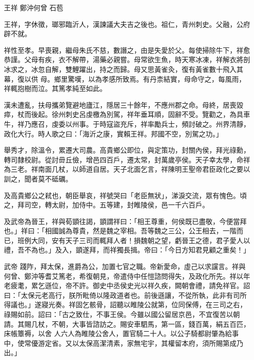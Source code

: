 
\begin{pinyinscope}
王祥
 鄭沖何曾
 石苞



 王祥，字休徵，瑯邪臨沂人，漢諫議大夫吉之後也。祖仁，青州刺史。父融，公府辟不就。



 祥性至孝。早喪親，繼母朱氏不慈，數譖之，由是失愛於父。每使掃除牛下，祥愈恭謹。父母有疾，衣不解帶，湯藥必親嘗。母常欲生魚，時天寒冰凍，祥解衣將剖冰求之，冰忽自解，雙鯉躍出，持之而歸。母又思黃雀灸，復有黃雀數十飛入其幕，復以供
 母。鄉里驚嘆，以為孝感所致焉。有丹柰結實，母命守之，每風雨，祥輒抱樹而泣。其篤孝純至如此。



 漢未遭亂，扶母攜弟覽避地廬江，隱居三十餘年，不應州郡之命。母終，居喪毀瘁，杖而後起。徐州刺史呂虔檄為別駕，祥年垂耳順，固辭不受。覽勸之，為具車牛，祥乃應召，虔委以州事。于時寇盜充斥，祥率勵兵士，頻討破之。州界清靜，政化大行。時人歌之曰：「海沂之康，實賴王祥。邦國不空，別駕之功。」



 舉秀才，除溫令，累遷大司農。高貴鄉公即位，與定策功，封關內侯，拜光祿勳，轉司隸校尉。從討毌丘儉，增邑四百戶，遷太常，封萬歲亭侯。天子幸太學，命祥
 為三老。祥南面几杖，以師道自居。天子北面乞言，祥陳明王聖帝君臣政化之要以訓之，聞者莫不砥礪。



 及高貴鄉公之弒也，朝臣舉哀，祥號哭曰「老臣無狀」，涕淚交流，眾有愧色。頃之，拜司空，轉太尉，加侍中。五等建，封睢陵侯，邑一千六百戶。



 及武帝為晉王，祥與荀顗往謁，顗謂祥曰：「相王尊重，何侯既已盡敬，今便當拜也。」祥曰：「相國誠為尊貴，然是魏之宰相。吾等魏之三公，公王相去，一階而已，班例大同，安有天子三司而輒拜人者！損魏朝之望，虧晉王之德，君子愛人以禮，吾不為也。」及入，顗遂拜，而祥獨長揖。帝曰：「今日方知君見顧之重矣！」



 武帝
 踐阼，拜太保，進爵為公，加置七官之職。帝新愛命，虛己以求讜言。祥與何曾、鄭沖等耆艾篤老，希復朝見，帝遣侍中任愷諮問得失，及政化所先。祥以年老疲耄，累乞遜位，帝不許。御史中丞侯史光以祥久疾，闕朝會禮，請免祥官。詔曰：「太保元老高行，朕所毗倚以隆政道者也。前後遜讓，不從所執，此非有司所得議也。」遂寢光奏。祥固乞骸骨，詔聽以睢陵公就第，位同保傅，在三司之右，祿賜如前。詔曰：「古之致仕，不事王侯。今雖以國公留居京邑，不宜復苦以朝請。其賜几杖，不朝，大事皆諮訪之。賜安車駟馬，第一區，錢百萬，絹五百匹，床帳簟褥，以舍
 人六人為睢陵公舍人，置官騎二十人。以公子騎都尉肇為給事中，使常優游定省。又以太保高潔清素，家無宅宇，其權留本府，須所賜第成乃出。」




\end{pinyinscope}
